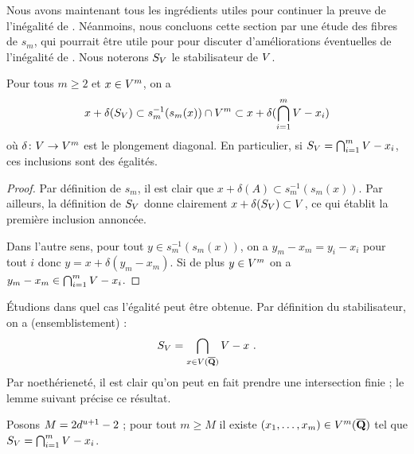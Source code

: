Nous avons maintenant tous les ingrédients utiles pour continuer la preuve de
l'inégalité de . Néanmoins, nous concluons cette section par une
étude des fibres de \( s_m \), qui pourrait être utile pour pour discuter
d'améliorations éventuelles de l'inégalité de . Nous noterons \(
  S_V \) le stabilisateur de \( V \).

\begin{lem}
  Pour tous \( m \ge 2 \) et \( x \in V^m \), on a
  \begin{equation}
    x + \delta(S_V)
    \subset
    s_m^{-1} ( s_m(x) ) \cap V^m
    \subset
    x + \delta(\bigcap_{i=1}^m V - x_i)
  \end{equation}
  où \( \delta \colon V \to V^m \) est le plongement diagonal. En
  particulier, si \( S_V = \bigcap_{i=1}^m V - x_i \), ces inclusions
  sont des égalités.
\end{lem}

\begin{proof}
  Par définition de \( s_m \), il est clair que \( x + \delta(A) \subset
    s_m^{-1} ( s_m(x) ) \). Par ailleurs, la définition de \( S_V \) donne
  clairement \( x + \delta(S_V) \subset V \), ce qui établit la
  première inclusion annoncée.

  Dans l'autre sens, pour tout \( y \in s_m^{-1} ( s_m(x) ) \), on a
  \( y_m - x_m = y_i - x_i \) pour tout \( i \) donc \( y = x +
    \delta(y_m - x_m) \). Si de plus \( y \in V^m \) on a \( y_m - x_m \in
    \bigcap_{i=1}^m V - x_i \).
\end{proof}

Étudions dans quel cas l'égalité peut être obtenue. Par définition du
stabilisateur, on a (ensemblistement) :
\begin{equation}
  S_V = \bigcap_{x \in V(\overline{{\mathbf{Q}}})} V - x
  \text{ .}
\end{equation}
Par noethérieneté, il est clair qu'on peut en fait prendre une intersection
finie ; le lemme suivant précise ce résultat.

\begin{lem}
  Posons \( M = 2 d^{u+1} - 2 \) ; pour tout \( m \ge M \) il existe
  \( (x_1, \dots, x_m) \in V^m(\overline{{\mathbf{Q}}}) \) tel que
  \( S_V = \bigcap_{i=1}^m V - x_i \).
\end{lem}

